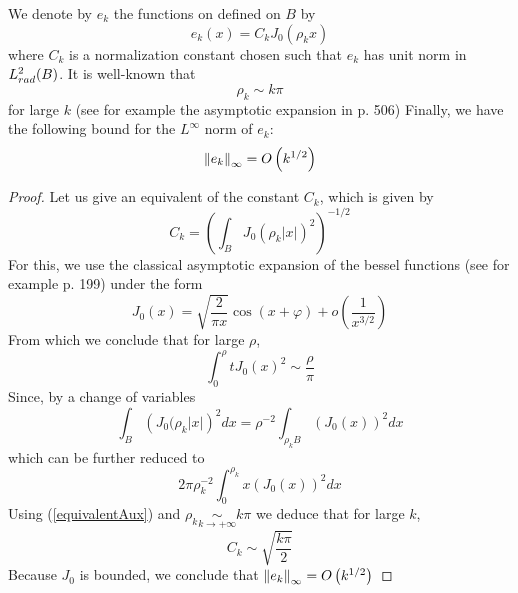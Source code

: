 \documentclass[11pt,a4paper]{article}
\begin{document}
\begin{Def} We denote by $e_{k}$ the functions on defined on $B$ by \[e_{k}(x) = C_{k} J_0(\rho_kx)\] where $C_{k}$ is a normalization constant chosen such that $e_{k}$ has unit norm in $L^2_{rad}(B)$. It is well-known that \[\rho_{k} \sim k\pi \] for large $k$ (see for example the asymptotic expansion in \cite{watson1995treatise} p. 506) Finally, we have the following bound for the $L^\infty$ norm of $e_{k}$:  \[ \left\|e_{k}\right\|_{\infty} = O\left(k^{1/2}\right)\] 


\begin{proof}
Let us give an equivalent of the constant $C_{k}$, which is given by 
\[C_{k} = \left(\int_{B} J_0(\rho_k |x|)^2\right)^{-1/2} \]
For this, we use the classical asymptotic expansion of the bessel functions  (see for example \cite{watson1995treatise} p. 199) under the form 
\[ J_0(x) = \sqrt{\dfrac{2}{\pi x}} \cos(x + \varphi) + o\left(\dfrac{1}{x^{3/2}}\right)\]
From which we conclude that for large $\rho$, 
\begin{equation}
\int_{0}^\rho t J_0(x)^2 \sim \dfrac{\rho}{\pi}
\label{equivalentAux}
\end{equation}
Since, by a change of variables \[ \int_{B} \left(J_0(\rho_k|x|\right)^2dx =   \rho^{-2}\int_{\rho_{k}B} \left(J_0(x)\right)^2dx\]
which can be further reduced to 
\[ 2\pi \rho_{k}^{-2} \int_{0}^{\rho_{k}} x \left(J_0(x)\right)^2dx\]
Using (\ref{equivalentAux}) and $\rho_{k} \underset{k\to +\infty}{\sim }k\pi$ we deduce that for large $k$, \[C_{k} \sim \sqrt{\dfrac{k\pi}{2}} \]
Because $J_0$ is bounded, we conclude that $\left\|e_{k}\right\|_{\infty} = O\left(k^{1/2}\right)$
\end{proof}
\end{Def}
\end{document}
